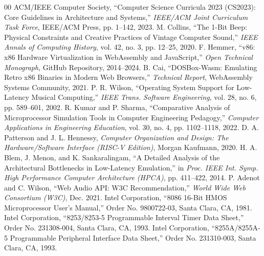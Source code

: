 \documentclass[conference]{IEEEtran}
\begin{document}
\begin{thebibliography}{00}
 ACM/IEEE Computer Society, ``Computer Science Curricula 2023 (CS2023): Core Guidelines in Architecture and Systems,'' \emph{IEEE/ACM Joint Curriculum Task Force}, IEEE/ACM Press, pp. 1--142, 2023.
 M. Collins, ``The 1-Bit Beep: Physical Constraints and Creative Practices of Vintage Computer Sound,'' \emph{IEEE Annals of Computing History}, vol. 42, no. 3, pp. 12--25, 2020.
 F. Hemmer, ``v86: x86 Hardware Virtualization in WebAssembly and JavaScript,'' \emph{Open Technical Monograph}, GitHub Repository, 2014--2024.
 B. Cai, ``DOSBox-Wasm: Emulating Retro x86 Binaries in Modern Web Browsers,'' \emph{Technical Report}, WebAssembly Systems Community, 2021.
 P. R. Wilson, ``Operating System Support for Low-Latency Musical Computing,'' \emph{IEEE Trans. Software Engineering}, vol. 28, no. 6, pp. 589--601, 2002.
 R. Kumar and P. Sharma, ``Comparative Analysis of Microprocessor Simulation Tools in Computer Engineering Pedagogy,'' \emph{Computer Applications in Engineering Education}, vol. 30, no. 4, pp. 1102--1118, 2022.
 D. A. Patterson and J. L. Hennessy, \emph{Computer Organization and Design: The Hardware/Software Interface (RISC-V Edition)}, Morgan Kaufmann, 2020.
 H. A. Blem, J. Menon, and K. Sankaralingam, ``A Detailed Analysis of the Architectural Bottlenecks in Low-Latency Emulation,'' in \emph{Proc. IEEE Int. Symp. High Performance Computer Architecture (HPCA)}, pp. 411--422, 2014.
 P. Adenot and C. Wilson, ``Web Audio API: W3C Recommendation,'' \emph{World Wide Web Consortium (W3C)}, Dec. 2021.
 Intel Corporation, ``8086 16-Bit HMOS Microprocessor User's Manual,'' Order No. 9800722-03, Santa Clara, CA, 1981.
 Intel Corporation, ``8253/8253-5 Programmable Interval Timer Data Sheet,'' Order No. 231308-004, Santa Clara, CA, 1993.
 Intel Corporation, ``8255A/8255A-5 Programmable Peripheral Interface Data Sheet,'' Order No. 231310-003, Santa Clara, CA, 1993.
\end{thebibliography}
\end{document}
